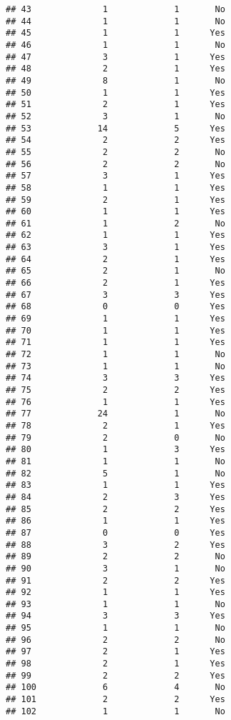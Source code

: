 \documentclass[
]{article}
\begin{document}
\begin{verbatim}
## 43              1             1       No
## 44              1             1       No
## 45              1             1      Yes
## 46              1             1       No
## 47              3             1      Yes
## 48              2             1      Yes
## 49              8             1       No
## 50              1             1      Yes
## 51              2             1      Yes
## 52              3             1       No
## 53             14             5      Yes
## 54              2             2      Yes
## 55              2             2       No
## 56              2             2       No
## 57              3             1      Yes
## 58              1             1      Yes
## 59              2             1      Yes
## 60              1             1      Yes
## 61              1             2       No
## 62              1             1      Yes
## 63              3             1      Yes
## 64              2             1      Yes
## 65              2             1       No
## 66              2             1      Yes
## 67              3             3      Yes
## 68              0             0      Yes
## 69              1             1      Yes
## 70              1             1      Yes
## 71              1             1      Yes
## 72              1             1       No
## 73              1             1       No
## 74              3             3      Yes
## 75              2             2      Yes
## 76              1             1      Yes
## 77             24             1       No
## 78              2             1      Yes
## 79              2             0       No
## 80              1             3      Yes
## 81              1             1       No
## 82              5             1       No
## 83              1             1      Yes
## 84              2             3      Yes
## 85              2             2      Yes
## 86              1             1      Yes
## 87              0             0      Yes
## 88              3             2      Yes
## 89              2             2       No
## 90              3             1       No
## 91              2             2      Yes
## 92              1             1      Yes
## 93              1             1       No
## 94              3             3      Yes
## 95              1             1       No
## 96              2             2       No
## 97              2             1      Yes
## 98              2             1      Yes
## 99              2             2      Yes
## 100             6             4       No
## 101             2             2      Yes
## 102             1             1       No

\end{verbatim}
\end{document}
